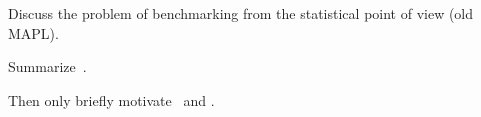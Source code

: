 Discuss the problem of benchmarking from the statistical point of view (old MAPL).

Summarize~\cite{goens_mapl19}.

Then only briefly motivate~\cite{brauckmann_cc20} and \cite{brauckmann_fdl20}.
